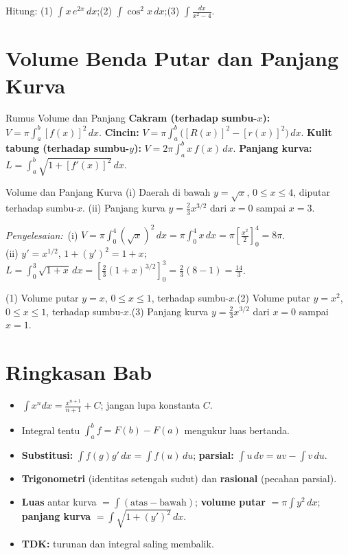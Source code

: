\documentclass[11pt,a4paper]{report}
\theoremstyle{gaya}
\newcommand{\jawab}{\par\smallskip\noindent\textit{\textcolor{oranye}{Penyelesaian:}}\ }
\begin{document}
\begin{latihan}
Hitung: (1) $\displaystyle\int x\,e^{2x}\,dx$;\quad (2) $\displaystyle\int\cos^2x\,dx$;\quad (3) $\displaystyle\int\frac{dx}{x^2-4}$.
\end{latihan}

\section{Volume Benda Putar dan Panjang Kurva}
\begin{konsep}{Rumus Volume dan Panjang}
\textbf{Cakram (terhadap sumbu-$x$):} $V=\pi\displaystyle\int_a^b [f(x)]^2\,dx$. \textbf{Cincin:} $V=\pi\displaystyle\int_a^b\big([R(x)]^2-[r(x)]^2\big)\,dx$. \textbf{Kulit tabung (terhadap sumbu-$y$):} $V=2\pi\displaystyle\int_a^b x\,f(x)\,dx$. \textbf{Panjang kurva:} $L=\displaystyle\int_a^b\sqrt{1+[f'(x)]^2}\,dx$.
\end{konsep}

\begin{contoh}{Volume dan Panjang Kurva}
(i) Daerah di bawah $y=\sqrt x$, $0\le x\le4$, diputar terhadap sumbu-$x$. (ii) Panjang kurva $y=\tfrac23 x^{3/2}$ dari $x=0$ sampai $x=3$.

\jawab (i) $V=\pi\displaystyle\int_0^4 (\sqrt x)^2\,dx=\pi\int_0^4 x\,dx=\pi\left[\tfrac{x^2}{2}\right]_0^4=8\pi$.\\
(ii) $y'=x^{1/2}$, $1+(y')^2=1+x$; $L=\displaystyle\int_0^3\sqrt{1+x}\,dx=\left[\tfrac23(1+x)^{3/2}\right]_0^3=\tfrac23(8-1)=\tfrac{14}{3}$.
\end{contoh}

\begin{latihan}
(1) Volume putar $y=x$, $0\le x\le1$, terhadap sumbu-$x$.\quad (2) Volume putar $y=x^2$, $0\le x\le1$, terhadap sumbu-$x$.\quad (3) Panjang kurva $y=\tfrac23 x^{3/2}$ dari $x=0$ sampai $x=1$.
\end{latihan}

\section*{Ringkasan Bab}
\begin{itemize}[leftmargin=*,topsep=2pt]
  \item $\int x^n dx=\tfrac{x^{n+1}}{n+1}+C$; jangan lupa konstanta $C$.
  \item Integral tentu $\int_a^b f=F(b)-F(a)$ mengukur luas bertanda.
  \item \textbf{Substitusi:} $\int f(g)g'\,dx=\int f(u)\,du$; \textbf{parsial:} $\int u\,dv=uv-\int v\,du$.
  \item \textbf{Trigonometri} (identitas setengah sudut) dan \textbf{rasional} (pecahan parsial).
  \item \textbf{Luas} antar kurva $=\int(\text{atas}-\text{bawah})$; \textbf{volume putar} $=\pi\int y^2\,dx$; \textbf{panjang kurva} $=\int\sqrt{1+(y')^2}\,dx$.
  \item \textbf{TDK:} turunan dan integral saling membalik.
\end{itemize}
\end{document}
